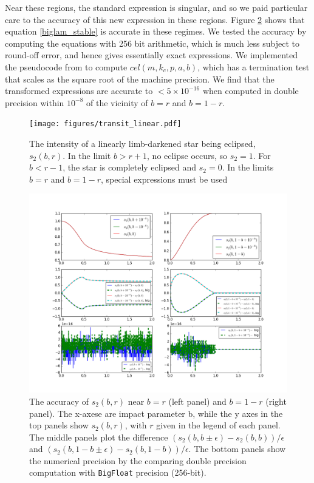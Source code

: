 \documentclass[modern]{aastex61}
\begin{document}
Near these regions, the standard \citet{MandelAgol2002} expression
is singular, and so we paid particular care to the accuracy of this
new expression in these regions.  Figure \ref{s2_machine} shows
that equation \ref{biglam_stable} is accurate in these regimes.
We tested the accuracy by computing the equations with 256 bit
arithmetic, which is much less subject to round-off error, and
hence gives essentially exact expressions.  We implemented the
pseudocode from \citet{Bulirsch1969} to compute $cel(m,k_c,p,a,b)$,
which has a termination test that scales as the square root of
the machine precision.  We find that the transformed expressions
are accurate to $<5\times 10^{-16}$ when computed in double precision
within $10^{-8}$ of the vicinity of $b=r$ and $b=1-r$.

\begin{figure}\label{s2_plot}
\texttt{[image: figures/transit\_linear.pdf]}
\caption{The intensity of a linearly limb-darkened star being eclipsed, $s_2(b,r)$.
In the limit $b > r+1$, no eclipse occurs, so $s_2=1$.  For $b < r-1$, the star
is completely eclipsed and $s_2=0$.  In the limits $b=r$ and $b=1-r$, special
expressions must be used}
\end{figure}

\begin{figure}\label{s2_machine}
\includegraphics[width=0.85\linewidth]{figures/s2_machine.png}
\caption{The accuracy of $s_2(b,r)$ near $b=r$ (left panel) and
$b=1-r$ (right panel). The x-axese are impact parameter b,
while the y axes in the top panels show $s_2(b,r)$, with $r$
given in the legend of each panel. The middle panels plot
the difference $(s_2(b,b\pm\epsilon)-s_2(b,b))/\epsilon$
and $(s_2(b,1-b\pm\epsilon)-s_2(b,1-b))/\epsilon$. The bottom
panels show the numerical precision by the comparing double precision
computation with \texttt{BigFloat} precision (256-bit).
}
\end{figure}
\end{document}

